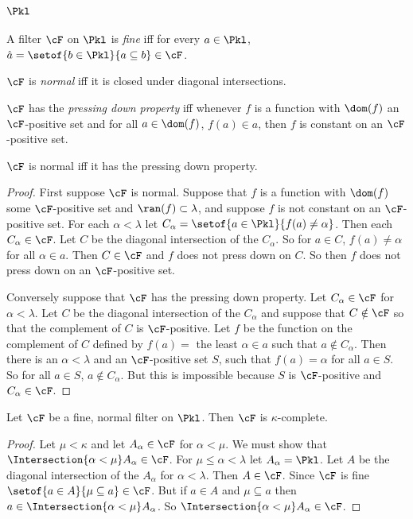 \documentclass[oneside,12pt]{amsart}
\begin{document}

\section{$\Pkl$}

\begin{definition}
A filter $\cF$ on $\Pkl$ is \emph{fine} iff for every $a\in\Pkl$,
$\hat{a}=\setof{b\in\Pkl}{a\subseteq b}\in\cF$.

$\cF$ is \emph{normal} iff it is closed under diagonal intersections.

$\cF$ has the \emph{pressing down property} iff whenever $f$ is a function
with $\dom(f)$ an $\cF$-positive set and for all $a\in\dom(f)$, $f(a)\in a$, then $f$ is constant on an
$\cF$-positive set.
\end{definition}

\begin{lemma}
$\cF$ is normal iff it has the pressing down property.
\end{lemma}
\begin{proof}
First suppose $\cF$ is normal. Suppose that $f$ is a function with $\dom(f)$ some $\cF$-positive set and $\ran(f)\subset\lambda$,
and suppose $f$ is not constant on an
$\cF$-positive set. For each $\alpha<\lambda$ let $C_{\alpha}=\setof{a\in\Pkl}{f(a)\not=\alpha}$. Then each $C_{\alpha}\in\cF$.
Let $C$ be the diagonal intersection of the $C_{\alpha}$. So for $a\in C$, $f(a)\not=\alpha$ for all $\alpha\in a$.
  Then $C\in\cF$ and $f$ does not press down on $C$.
So then $f$ does not press down on an $\cF$-positive set.

Conversely suppose that $\cF$ has the pressing down property. Let $C_{\alpha}\in\cF$ for $\alpha<\lambda$. Let $C$ be the diagonal
intersection of the $C_{\alpha}$ and suppose that $C\notin\cF$ so that the complement of $C$ is $\cF$-positive. Let $f$ be the
function on the complement of $C$ defined by $f(a) = $ the least $\alpha\in a$ such that $a\notin C_{\alpha}$. Then there is an $\alpha<\lambda$
and an $\cF$-positive set $S$, such that $f(a)=\alpha$ for all $a\in S$.
So for all $a\in S$, $a\notin C_{\alpha}$. But this is impossible because $S$ is $\cF$-positive and
$C_{\alpha}\in\cF$.
\end{proof}

\begin{lemma}
Let $\cF$ be a fine, normal filter on $\Pkl$. Then $\cF$ is $\kappa$-complete.
\end{lemma}
\begin{proof}
Let $\mu<\kappa$ and let $A_{\alpha}\in\cF$ for $\alpha<\mu$. We must show that
$\Intersection{\alpha<\mu}A_{\alpha}\in\cF$. For $\mu\leq\alpha<\lambda$ let
$A_{\alpha}=\Pkl$. Let $A$ be the diagonal intersection of the $A_{\alpha}$
for $\alpha<\lambda$. Then $A\in\cF$. Since $\cF$ is fine $\setof{a\in A}{\mu\subseteq a}\in\cF$.
But if $a\in A$ and $\mu\subseteq a$ then $a\in\Intersection{\alpha<\mu}A_{\alpha}$. So
$\Intersection{\alpha<\mu}A_{\alpha}\in\cF$.
\end{proof}
\end{document}
